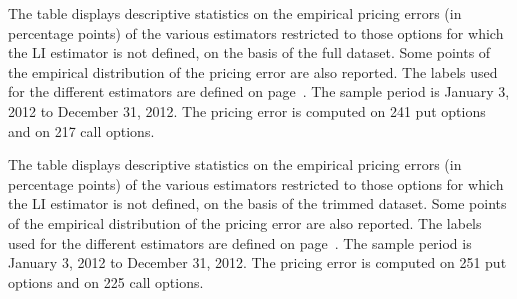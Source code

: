 \documentclass[11pt]{article}
\theoremstyle{remark}
\begin{document}
\begin{table}[tbp]
\caption{Pricing errors outside the convex hull (full dataset)}
\begin{center}
\vspace{2mm}
\parbox{\textwidth}{\footnotesize The table displays descriptive
  statistics on the empirical pricing errors (in percentage points) of
  the various estimators restricted to those options for which the LI
  estimator is not defined, on the basis of the full dataset. Some
  points of the empirical distribution of the pricing error are also
  reported. The labels used for the different estimators are defined
  on page~\pageref{etichette}. The sample period is January 3, 2012 to
  December 31, 2012. The pricing error is computed on 241 put options
  and on 217 call options. \vspace{4mm}}
\footnotesize{{}}
\end{center}
\label{table4}
\end{table}

\begin{table}[tbp]
\caption{Pricing errors outside the convex hull (trimmed dataset)}
\begin{center}
\vspace{2mm}
\parbox{\textwidth}{\footnotesize The table displays descriptive
  statistics on the empirical pricing errors (in percentage points) of
  the various estimators restricted to those options for which the LI
  estimator is not defined, on the basis of the trimmed dataset. Some
  points of the empirical distribution of the pricing error are also
  reported.  The labels used for the different estimators are defined
  on page~\pageref{etichette}. The sample period is January 3, 2012 to
  December 31, 2012. The pricing error is computed on 251 put options
  and on 225 call options. \vspace{4mm}}
\footnotesize{{}}
\end{center}
\label{table5}
\end{table}
\end{document}
